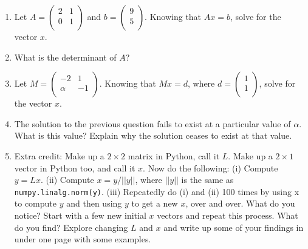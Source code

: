 \documentclass[11pt,onecolumn,superscriptaddress,notitlepage]{article}
\begin{document}
\begin{enumerate}[resume]
	\item Let $A=
\begin{pmatrix}
2 & 1   \\ 
0 & 1 \\
\end{pmatrix}$
and $b=
\begin{pmatrix}
9 \\ 
5 \\
\end{pmatrix}$. Knowing that $Ax=b$, solve for the vector $x$.
\item What is the determinant of $A$?
\item Let $M=
\begin{pmatrix}
-2 & 1   \\ 
\alpha & -1 \\
\end{pmatrix}$. Knowing that $Mx=d$, where $d=\begin{pmatrix}
1 \\ 
1 \\
\end{pmatrix}$, solve for the vector $x$.  
\item The solution to the previous question fails to exist at a particular value of $\alpha$. What is this value? Explain why the solution ceases to exist at that value.
\item Extra credit: Make up a $2 \times 2$ matrix in Python, call it $L$. Make up a $2 \times 1$ vector in Python too, and call it $x$. Now do the following: (i) Compute $y=Lx$. (ii) Compute $x = y / || y ||$, where $||y||$ is the same as \texttt{numpy.linalg.norm(y)}. (iii) Repeatedly do (i) and (ii) 100 times by using x to compute $y$ and then using $y$ to get a new $x$, over and over. What do you notice? Start with a few new initial $x$  vectors and repeat this process. What do you find?  Explore changing $L$ and $x$ and write up some of your findings in under one page with some examples. 
\end{enumerate}

\end{document}
